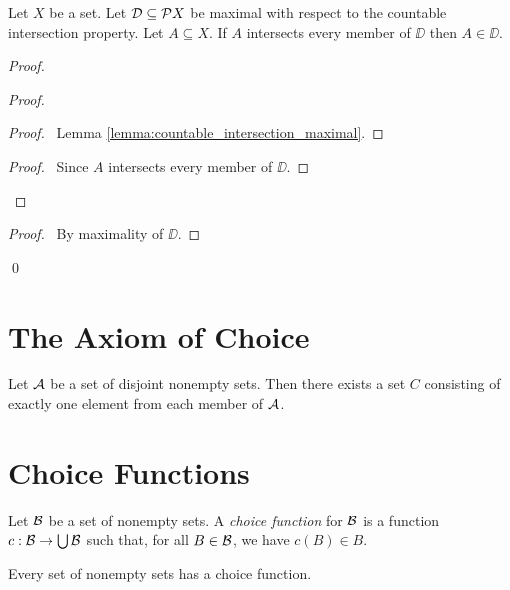 \begin{lemma}
    Let $X$ be a set. Let $\DD \subseteq \pow X$ be maximal with respect to the countable intersection property.
    Let $A \subseteq X$. If $A$ intersects every member of $\DD$ then $A \in \DD$.
\end{lemma}

\begin{proof}
    \pf
    \begin{proof}
        \begin{proof}
            \pf\ Lemma \ref{lemma:countable_intersection_maximal}.
        \end{proof}
        \begin{proof}
            \pf\ Since $A$ intersects every member of $\DD$.
        \end{proof}
    \end{proof}
    \qedstep
    \begin{proof}
        \pf\ By maximality of $\DD$.
    \end{proof}
    \qed
\end{proof}

\section{The Axiom of Choice}

\begin{axiom}
    Let $\AA$ be a set of disjoint nonempty sets. Then there exists a set $C$ consisting of exactly one element from each member of $\AA$.
\end{axiom}

\section{Choice Functions}

\begin{definition}
    Let $\BB$ be a set of nonempty sets. A \emph{choice function} for $\BB$ is a function $c : \BB \rightarrow \bigcup \BB$ such that, for all $B \in \BB$,
    we have $c(B) \in B$.
\end{definition}

\begin{lemma}
    \label{lemma:choice_function}
    Every set of nonempty sets has a choice function.
\end{lemma}

